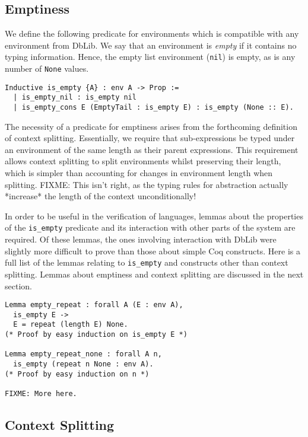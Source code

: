 \documentclass[]{unswthesis}
\let\c\texttt
\let\i\textit
\begin{document}
\subsection{Emptiness}

We define the following predicate for environments which is compatible with any environment from DbLib. We say that an environment is \i{empty} if it contains no typing information. Hence, the empty list environment (\c{nil}) is empty, as is any number of \c{None} values.

\begin{verbatim}
Inductive is_empty {A} : env A -> Prop :=
  | is_empty_nil : is_empty nil
  | is_empty_cons E (EmptyTail : is_empty E) : is_empty (None :: E).
\end{verbatim}

The necessity of a predicate for emptiness arises from the forthcoming definition of context splitting. Essentially, we require that sub-expressions be typed under an environment of the same length as their parent expressions. This requirement allows context splitting to split environments whilst preserving their length, which is simpler than accounting for changes in environment length when splitting. FIXME: This isn't right, as the typing rules for abstraction actually *increase* the length of the context unconditionally!

In order to be useful in the verification of languages, lemmas about the properties of the \c{is_empty} predicate and its interaction with other parts of the system are required. Of these lemmas, the ones involving interaction with DbLib were slightly more difficult to prove than those about simple Coq constructs. Here is a full list of the lemmas relating to \c{is_empty} and constructs other than context splitting. Lemmas about emptiness and context splitting are discussed in the next section.

\begin{verbatim}
Lemma empty_repeat : forall A (E : env A),
  is_empty E ->
  E = repeat (length E) None.
(* Proof by easy induction on is_empty E *)

Lemma empty_repeat_none : forall A n,
  is_empty (repeat n None : env A).
(* Proof by easy induction on n *)

FIXME: More here.
\end{verbatim}

\subsection{Context Splitting}
\end{document}
